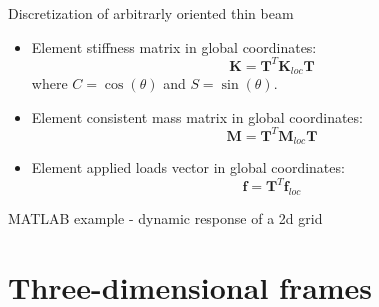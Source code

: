 \documentclass[aspectratio=169]{beamer}
\begin{document}
\begin{frame}{Discretization of arbitrarly oriented thin beam}
  \begin{itemize}
    \item Element stiffness matrix in global coordinates:
          $$\mathbf{K} = \mathbf T^T \mathbf{K}_{loc} \mathbf T$$
          where $C=\cos(\theta)$ and $S=\sin(\theta)$.
    \item Element consistent mass matrix in global coordinates:
          $$\mathbf{M} = \mathbf T^T \mathbf{M}_{loc} \mathbf T$$
    \item Element applied loads vector in global coordinates:
          \[
            \mathbf{f} = \mathbf T^T \mathbf{f}_{loc}
          \]
  \end{itemize}
\end{frame}


\begin{frame}{MATLAB example - dynamic response of a 2d grid}
  \begin{center}
    \href{https://drive.mathworks.com/sharing/6a9792ef-d0a7-4aca-a1d0-8b1862b0ac3b}{}
  \end{center}
\end{frame}

\section{Three-dimensional frames}
\end{document}
